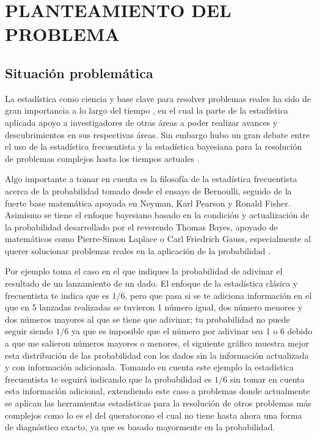 \newpage
\chapter{PLANTEAMIENTO DEL PROBLEMA}

\section{Situación problemática}
La estadística como ciencia y base clave para resolver problemas reales ha sido de gran importancia a lo largo del tiempo \citep{spiegelhalter2023arte}, en el cual la parte de la estadística aplicada apoyo a investigadores de otras áreas a poder realizar avances y descubrimientos en sus respectivas áreas. Sin embargo hubo un gran debate 
entre el uso de la estadística frecuentista y la estadística bayesiana para la resolución de problemas complejos hasta los tiempos actuales \citep{clayton2021bernoulli}.

Algo importante a tomar en cuenta es la filosofía de la estadística frecuentista acerca de la probabilidad tomado desde el ensayo de Bernoulli, seguido de la fuerte base matemática apoyada en Neyman, Karl Pearson y Ronald Fisher. Asimismo se tiene el enfoque bayesiano basado en la condición y actualización de la probabilidad desarrollado por el reverendo Thomas Bayes, apoyado de matemáticos como Pierre-Simon Laplace o Carl Friedrich Gauss, especialmente al querer solucionar problemas reales en la aplicación de la probabilidad \citep{clayton2021bernoulli}.

Por ejemplo \cite{clayton2021bernoulli} toma el caso en el que indiques la probabilidad de adivinar el resultado de un lanzamiento de un dado. El enfoque de la estadística clásica y frecuentista te indica que es $1/6$, pero que pasa si se te adiciona información en el que en 5 lanzadas realizadas se tuvieron 1 número igual, dos número menores y dos números mayores al que se tiene que adivinar; tu probabilidad no puede seguir siendo $1/6$ ya que es imposible que el número por adivinar sea 1 o 6 debido a que me salieron números mayores o menores, el siguiente gráfico muestra mejor esta distribución de las probabilidad con los dados sin la información actualizada y con información adicionada. Tomando en cuenta este ejemplo la estadística frecuentista te seguirá indicando que la probabilidad es $1/6$ sin tomar en cuenta esta información adicional, extendiendo este caso a problemas donde actualmente se aplican las herramientas estadísticas para la resolución de otros problemas más complejos como lo es el del queratocono el cual no tiene hasta ahora una forma de diagnóstico exacto, ya que es basado mayormente en la probabilidad.

